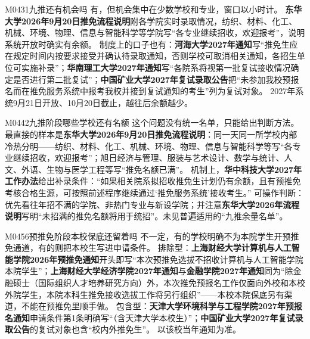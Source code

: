 \begin{qa}{M0431}{九推还有机会吗}
有，但机会集中在少数学校和专业，窗口以小时计。
\textbf{东华大学2026年9月20日推免流程说明}附各学院实时录取情况，纺织、材料、化工、机械、环境、物理、信息与智能科学等学院写“各专业继续招收，欢迎报考”，说明系统开放时确实有余额。
制度上的口子也有：\textbf{河海大学2027年通知}写“推免生应在规定时间内按要求接受并确认待录取通知，否则学校可取消相关通知，各招生单位可实施补录”；\textbf{华南理工大学2027年通知}写“各院系将视第一批复试接收情况确定是否进行第二批复试”；\textbf{中国矿业大学2027年复试录取公告}把“未参加我校预报名而在推免服务系统中报考我校并接到复试通知的考生”列为复试对象。
2027年系统9月21日开放、10月20日截止，越往后余额越少。
\end{qa}

\begin{qa}{M0442}{九推阶段哪些学校还有名额}
这个问题没有统一名单，只能给出判断方法。
最直接的样本是\textbf{东华大学2026年9月20日推免流程说明}：同一天同一所学校内部冷热分明——纺织、材料、化工、机械、环境、物理、信息与智能科学等写“各专业继续招收，欢迎报考”；旭日经济与管理、服装与艺术设计、数学与统计、人文、外语、生物与医学工程等写“推免名额已满”。
机制上，\textbf{华中科技大学2027年工作办法}给出补录条件：“如果相关院系拟招收推免生计划仍有余额，且有预推免考核合格生源，可按照前述程序继续通过‘推免服务系统’接收考生。”
可操作判断：优先看往年招不满的学院、非热门专业与新设学院；并注意\textbf{东华大学2026年流程说明}写明“未招满的推免名额将用于统招”。未见普遍适用的“九推余量名单”。
\end{qa}

\begin{qa}{M0456}{预推免阶段本校保底还留着吗}
不一定，有的学校明确不为本院学生开预推免通道，有的则把本校生写进申请条件。
排除型：\textbf{上海财经大学计算机与人工智能学院2026年预推免通知}开头即写“本次预推免选拔不招收计算机与人工智能学院本院学生”；\textbf{上海财经大学经济学院2027年通知}与\textbf{金融学院2027年通知}同为“除金融硕士（国际组织人才培养研究方向）外，本次推免预报名工作仅面向外校和本校外院学生，本院本科生推免接收选拔工作将另行组织”——本校本院保底另有渠道，不能在预推免里顺手做。
包含型：\textbf{天津大学环境科学与工程学院2027年预报名通知}申请条件第1条明确写“（含天津大学本校生）”；\textbf{中国矿业大学2027年复试录取公告}的复试对象也含“校内外推免生”。
以该校当年通知为准。
\end{qa}

